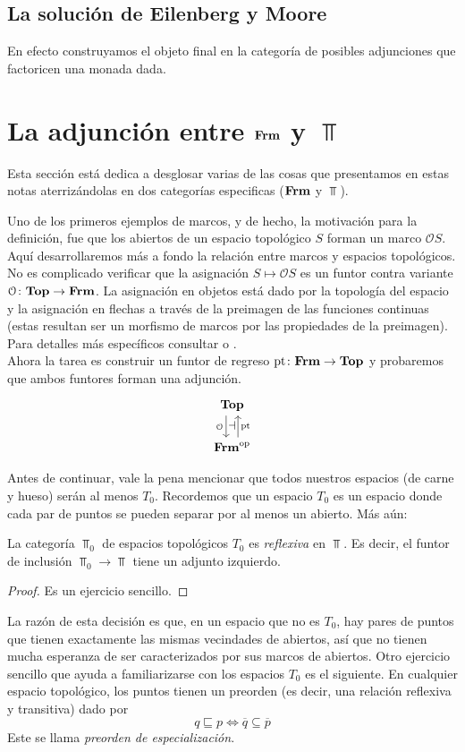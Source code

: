 \documentclass{comunicaciones}
\begin{document}
\subsection{La solución de Eilenberg y Moore}\label{EMSOL}

En efecto construyamos el objeto final en la categoría de posibles adjunciones que factoricen una monada dada.


\section{La adjunción entre $\mathbf{Frm}$ y $\Top$}

Esta sección está dedica a desglosar varias de las cosas que presentamos en estas notas aterrizándolas en dos categorías especificas ($\mathbf{Frm}$ y $\Top$).

Uno de los primeros ejemplos de marcos, y de hecho, la
motivación para la definición, fue que los abiertos de un espacio
topológico $S$ forman un marco $\mathcal{O}S$.
Aquí desarrollaremos más a fondo la relación entre marcos
y espacios topológicos. No es complicado verificar que la asignación $S\mapsto\mathcal{O}S$ es
un funtor contra variante $\mathcal{O}\colon\mathbf{Top}\to\mathbf{Frm}$. La asignación en objetos está dado por la topología del espacio y la asignación en flechas a través de la preimagen de las funciones continuas (estas resultan ser un morfismo de marcos por las propiedades de la preimagen). Para detalles más específicos consultar \cite{P.T.} o \cite{J.P.}.\\

Ahora la tarea es construir un funtor de regreso $\mathrm{pt}\colon\mathbf{Frm}\to\mathbf{Top}$
y probaremos que ambos funtores forman una adjunción.
\[
  \begin{tikzcd}
    \Top \ar[d,shift right=2,"\Cal O"'{name=L}]
    \\
    \Frm^\op \ar[u,shift right=2,"\pt"'{name=R}]
    \adj{L}{R}
  \end{tikzcd}
\]

Antes de continuar, vale la pena mencionar que todos nuestros espacios
(de carne y hueso) serán al menos $T_{0}$. Recordemos que un espacio
$T_0$ es un espacio donde cada par de puntos se pueden separar por al
menos un abierto. Más aún:
\begin{thm}\label{tcero}
    La categoría $\Top_0$ de espacios topológicos
    $T_0$  es \emph{reflexiva} en $\Top$.
    Es decir, el funtor de inclusión $\Top_0\to\Top$
    tiene un adjunto izquierdo.
\end{thm}
\begin{proof}
Es un ejercicio sencillo.
\end{proof}
La razón de esta decisión es que, en un espacio que no es $T_0$, hay
pares de puntos que tienen exactamente las mismas vecindades de
abiertos, así que no tienen mucha esperanza de ser caracterizados por
sus marcos de abiertos.
Otro ejercicio sencillo que ayuda a familiarizarse con los espacios
$T_0$ es el siguiente. En cualquier espacio topológico, los puntos
tienen un preorden (es decir, una relación reflexiva y transitiva)
dado por
  \[q\sqsubseteq p\iff \overline{q}\subseteq \overline{p}\]
  Este se llama \emph{preorden de especialización}.
\end{document}
